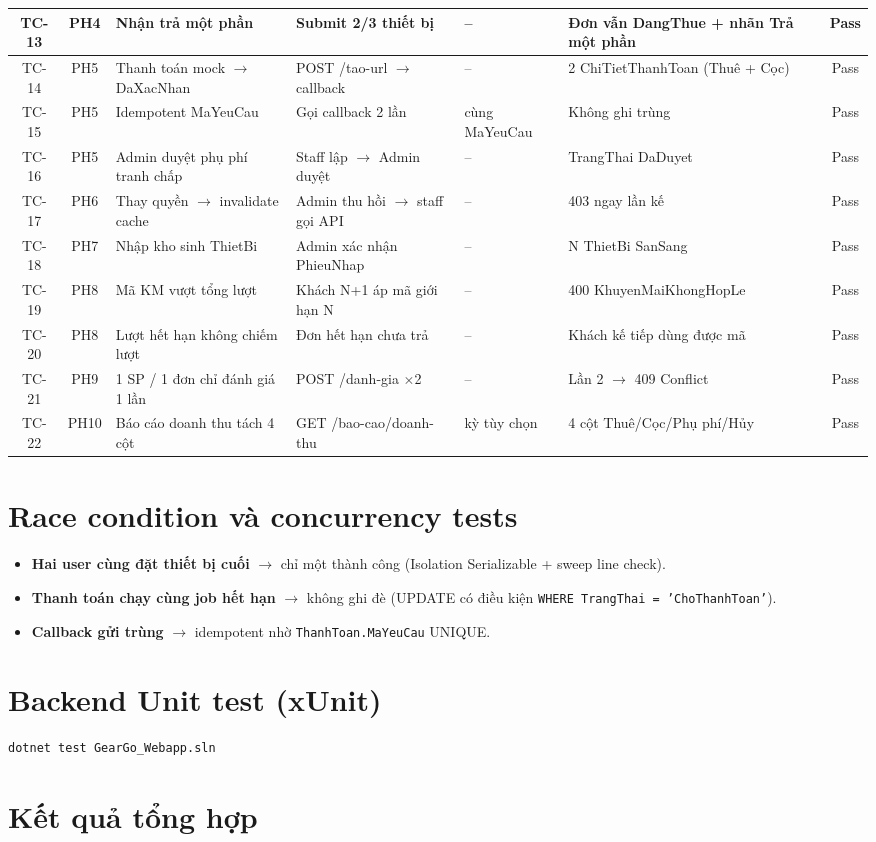\begin{longtable}{|c|c|p{3.5cm}|p{4cm}|p{2.5cm}|p{3cm}|c|}
TC-13 & PH4 & Nhận trả một phần               & Submit 2/3 thiết bị         & -- & Đơn vẫn DangThue + nhãn Trả một phần & Pass \\ \hline
TC-14 & PH5 & Thanh toán mock $\to$ DaXacNhan & POST /tao-url $\to$ callback & -- & 2 ChiTietThanhToan (Thuê + Cọc) & Pass \\ \hline
TC-15 & PH5 & Idempotent MaYeuCau             & Gọi callback 2 lần          & cùng MaYeuCau & Không ghi trùng & Pass \\ \hline
TC-16 & PH5 & Admin duyệt phụ phí tranh chấp  & Staff lập $\to$ Admin duyệt & -- & TrangThai DaDuyet & Pass \\ \hline
TC-17 & PH6 & Thay quyền $\to$ invalidate cache & Admin thu hồi $\to$ staff gọi API & -- & 403 ngay lần kế & Pass \\ \hline
TC-18 & PH7 & Nhập kho sinh ThietBi          & Admin xác nhận PhieuNhap    & -- & N ThietBi SanSang & Pass \\ \hline
TC-19 & PH8 & Mã KM vượt tổng lượt           & Khách N+1 áp mã giới hạn N  & -- & 400 KhuyenMaiKhongHopLe & Pass \\ \hline
TC-20 & PH8 & Lượt hết hạn không chiếm lượt  & Đơn hết hạn chưa trả        & -- & Khách kế tiếp dùng được mã & Pass \\ \hline
TC-21 & PH9 & 1 SP / 1 đơn chỉ đánh giá 1 lần & POST /danh-gia $\times$2    & -- & Lần 2 $\to$ 409 Conflict & Pass \\ \hline
TC-22 & PH10 & Báo cáo doanh thu tách 4 cột   & GET /bao-cao/doanh-thu      & kỳ tùy chọn & 4 cột Thuê/Cọc/Phụ phí/Hủy & Pass \\ \hline
\end{longtable}

\section{Race condition và concurrency tests}
\label{sec:race}

\begin{itemize}
  \item \textbf{Hai user cùng đặt thiết bị cuối} $\to$ chỉ một thành công (Isolation Serializable + sweep line check).
  \item \textbf{Thanh toán chạy cùng job hết hạn} $\to$ không ghi đè (UPDATE có điều kiện \texttt{WHERE TrangThai = 'ChoThanhToan'}).
  \item \textbf{Callback gửi trùng} $\to$ idempotent nhờ \texttt{ThanhToan.MaYeuCau} UNIQUE.
\end{itemize}

\section{Backend Unit test (xUnit)}
\label{sec:unit_test}

\begin{lstlisting}[language=bash]
dotnet test GearGo_Webapp.sln
\end{lstlisting}

\section{Kết quả tổng hợp}
\label{sec:ket_qua_test}
